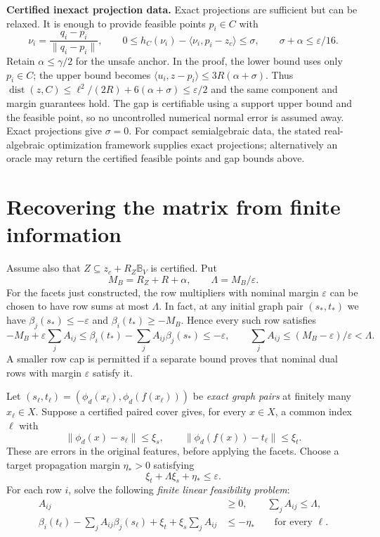 \documentclass[10pt,letterpaper]{article}
\theoremstyle{remark}
\newcommand{\dist}{\operatorname{dist}}
\newcommand{\ball}{\mathbb B_V}
\begin{document}
\textbf{Certified inexact projection data.}
Exact projections are sufficient but can be relaxed. It is enough to provide feasible points $p_i\in C$ with
\[
 \nu_i=\frac{q_i-p_i}{\|q_i-p_i\|},\qquad
 0\leq h_C(\nu_i)-\langle \nu_i,p_i-z_c\rangle\leq\sigma,
 \qquad \sigma+\alpha\leq\varepsilon/16.
\]
Retain $\alpha\leq\gamma/2$ for the unsafe anchor. In the proof, the lower bound uses only $p_i\in C$; the upper bound becomes
$\langle u_i,z-p_i\rangle\leq3R(\alpha+\sigma)$.
Thus $\dist(z,C)\leq\ell^2/(2R)+6(\alpha+\sigma)\leq\varepsilon/2$ and the same component and margin guarantees hold. The gap is certifiable using a support upper bound and the feasible point, so no uncontrolled numerical normal error is assumed away. Exact projections give $\sigma=0$. For compact semialgebraic data, the stated real-algebraic optimization framework supplies exact projections; alternatively an oracle may return the certified feasible points and gap bounds above.

\section{Recovering the matrix from finite information}\label{sec:lp}
Assume also that $Z\subseteq z_c+R_Z\ball$ is certified. Put
\[
 M_B=R_Z+R+\alpha,\qquad \Lambda=M_B/\varepsilon.
\]
For the facets just constructed, the row multipliers with nominal margin $\varepsilon$ can be chosen to have row sums at most $\Lambda$. In fact, at any initial graph pair $(s_*,t_*)$ we have $\beta_j(s_*)\leq-\varepsilon$ and $\beta_i(t_*)\geq-M_B$. Hence every such row satisfies
\[
 -M_B+\varepsilon\sum_j A_{ij}
 \leq\beta_i(t_*)-\sum_j A_{ij}\beta_j(s_*)\leq-\varepsilon,
 \qquad \sum_jA_{ij}\leq(M_B-\varepsilon)/\varepsilon<\Lambda.
\]
A smaller row cap is permitted if a separate bound proves that nominal dual rows with margin $\varepsilon$ satisfy it.

Let $(s_\ell,t_\ell)=(\phi_d(x_\ell),\phi_d(f(x_\ell)))$ be \emph{exact graph pairs} at finitely many $x_\ell\in X$. Suppose a certified paired cover gives, for every $x\in X$, a common index $\ell$ with
\begin{equation}\label{eq:paircover}
 \|\phi_d(x)-s_\ell\|\leq\xi_s,\qquad
 \|\phi_d(f(x))-t_\ell\|\leq\xi_t.
\end{equation}
These are errors in the original features, before applying the facets. Choose a target propagation margin $\eta_*>0$ satisfying
\begin{equation}\label{eq:budget}
 \xi_t+\Lambda\xi_s+\eta_*\leq\varepsilon.
\end{equation}
For each row $i$, solve the following \emph{finite linear feasibility problem}:
\begin{equation}\label{eq:lp}
 \begin{aligned}
 A_{ij}&\geq0,\qquad \sum_jA_{ij}\leq\Lambda,\\
 \beta_i(t_\ell)-\sum_jA_{ij}\beta_j(s_\ell)
       +\xi_t+\xi_s\sum_jA_{ij}&\leq-\eta_*
       \qquad\text{for every }\ell.
 \end{aligned}
\end{equation}
\end{document}
